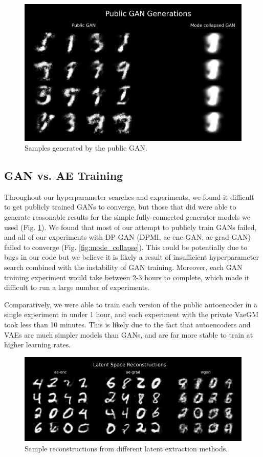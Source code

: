 \documentclass{article}
\begin{document}
\begin{figure}[!h]
    \centering
    \includegraphics[width=0.7\columnwidth]{images/public_gan_training.png}
    \caption{Samples generated by the public GAN.}
    \label{fig:public_gan_training}
\end{figure}

\subsection{GAN vs. AE Training}
Throughout our hyperparameter searches and experiments, we found it difficult to get publicly trained GANs to converge, but those that did were able to generate reasonable results for the simple fully-connected generator models we used (Fig. \ref{fig:public_gan_training}). We found that most of our attempt to publicly train GANs failed, and all of our experiments with DP-GAN (DPMI, ae-enc-GAN, ae-grad-GAN) failed to converge (Fig. \ref{fig:mode_collapse}). This could be potentially due to bugs in our code but we believe it is likely a result of insufficient hyperparameter search combined with the instability of GAN training. Moreover, each GAN training experiment would take between 2-3 hours to complete, which made it difficult to run a large number of experiments. 

Comparatively, we were able to train each version of the public autoencoder in a single experiment in under 1 hour, and each experiment with the private VaeGM took less than 10 minutes. This is likely due to the fact that autoencoders and VAEs are much simpler models than GANs, and are far more stable to train at higher learning rates. 


\begin{figure}[!h]
    \centering
    \includegraphics[width=0.8\columnwidth]{images/latent_samples.png}
    \caption{Sample reconstructions from different latent extraction methods.}
    \label{fig:latent_samples}
\end{figure}
\end{document}
